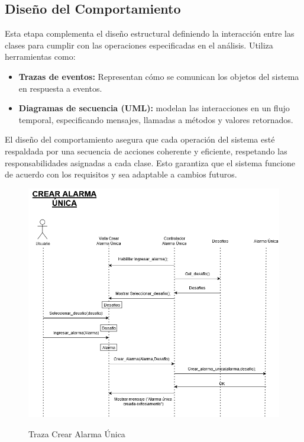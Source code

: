  \subsection{Diseño del Comportamiento}
 Esta etapa complementa el diseño estructural definiendo la interacción entre las clases para cumplir con las operaciones especificadas en el análisis. Utiliza herramientas como:
 
\begin{itemize}
        \item \textbf{Trazas de eventos:} Representan cómo se comunican los objetos del sistema en respuesta a eventos.
        \item \textbf{Diagramas de secuencia (UML):} modelan las interacciones en un flujo temporal, especificando mensajes, llamadas a métodos y valores retornados.
\end{itemize}

El diseño del comportamiento asegura que cada operación del sistema esté respaldada por una secuencia de acciones coherente y eficiente, respetando las responsabilidades asignadas a cada clase. Esto garantiza que el sistema funcione de acuerdo con los requisitos y sea adaptable a cambios futuros.



 \begin{figure}[H]
	\centering
	\caption{Traza Crear Alarma Única}
	\includegraphics[width=\textwidth]{./img/Crear_Alarma_Unica.png}
        \vspace{10pt}
	\label{fig:Traza Crear Alarma Única}
\end{figure}

